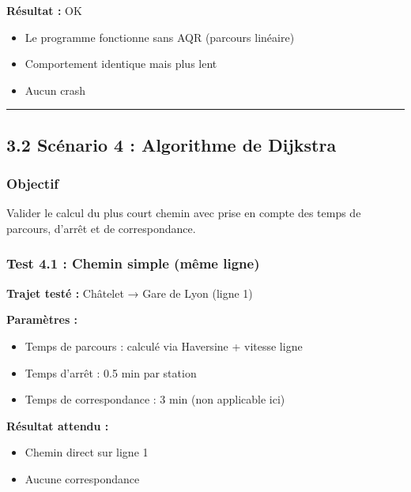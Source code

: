 \documentclass[
]{article}
\newcommand{\OK}{OK~\twemoji{white_check_mark}}
\newcommand{\OK}{OK~\twemoji{white_check_mark}}
\providecommand{\tightlist}{%
  \setlength{\itemsep}{0pt}\setlength{\parskip}{0pt}}
\begin{document}
\textbf{Résultat :} \OK

\begin{itemize}
\tightlist
\item
  Le programme fonctionne sans AQR (parcours linéaire)
\item
  Comportement identique mais plus lent
\item
  Aucun crash
\end{itemize}

\begin{center}\rule{0.5\linewidth}{0.5pt}\end{center}

\subsection{3.2 Scénario 4 : Algorithme de
Dijkstra}\label{scuxe9nario-4-algorithme-de-dijkstra}

\subsubsection{Objectif}\label{objectif-3}

Valider le calcul du plus court chemin avec prise en compte des temps de
parcours, d'arrêt et de correspondance.

\subsubsection{Test 4.1 : Chemin simple (même
ligne)}\label{test-4.1-chemin-simple-muxeame-ligne}

\textbf{Trajet testé :} Châtelet → Gare de Lyon (ligne 1)

\textbf{Paramètres :}

\begin{itemize}
\tightlist
\item
  Temps de parcours : calculé via Haversine + vitesse ligne
\item
  Temps d'arrêt : 0.5 min par station
\item
  Temps de correspondance : 3 min (non applicable ici)
\end{itemize}

\textbf{Résultat attendu :}

\begin{itemize}
\tightlist
\item
  Chemin direct sur ligne 1
\item
  Aucune correspondance
\end{itemize}
\end{document}
